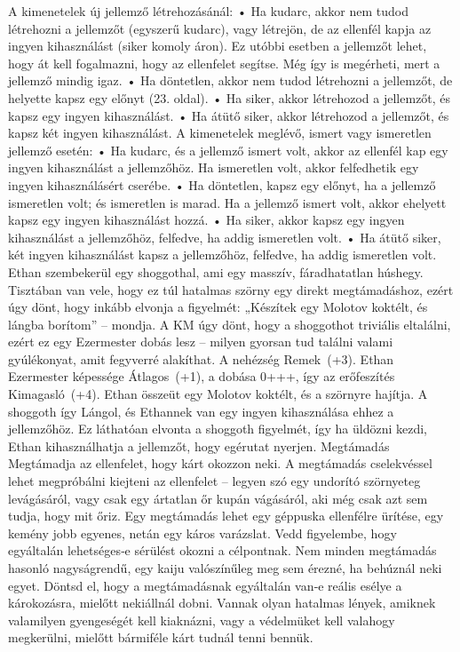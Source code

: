 \documentclass[oneside]{book}
\begin{document}
A kimenetelek új jellemző létrehozásánál:
    • Ha kudarc, akkor nem tudod létrehozni a jellemzőt (egyszerű kudarc), vagy létrejön, de az ellenfél kapja az ingyen kihasználást (siker komoly áron). Ez utóbbi esetben a jellemzőt lehet, hogy át kell fogalmazni, hogy az ellenfelet segítse. Még így is megérheti, mert a jellemző mindig igaz.
    • Ha döntetlen, akkor nem tudod létrehozni a jellemzőt, de helyette kapsz egy előnyt (23. oldal).
    • Ha siker, akkor létrehozod a jellemzőt, és kapsz egy ingyen kihasználást.
    • Ha átütő siker, akkor létrehozod a jellemzőt, és kapsz két ingyen kihasználást.
A kimenetelek meglévő, ismert vagy ismeretlen jellemző esetén:
    • Ha kudarc, és a jellemző ismert volt, akkor az ellenfél kap egy ingyen kihasználást a jellemzőhöz. Ha ismeretlen volt, akkor felfedhetik egy ingyen kihasználásért cserébe.
    • Ha döntetlen, kapsz egy előnyt, ha a jellemző ismeretlen volt; és ismeretlen is marad. Ha a jellemző ismert volt, akkor ehelyett kapsz egy ingyen kihasználást hozzá.
    • Ha siker, akkor kapsz egy ingyen kihasználást a jellemzőhöz, felfedve, ha addig ismeretlen volt.
    • Ha átütő siker, két ingyen kihasználást kapsz a jellemzőhöz, felfedve, ha addig ismeretlen volt.
Ethan szembekerül egy shoggothal, ami egy masszív, fáradhatatlan húshegy. Tisztában van vele, hogy ez túl hatalmas szörny egy direkt megtámadáshoz, ezért úgy dönt, hogy inkább elvonja a figyelmét: „Készítek egy Molotov koktélt, és lángba borítom” – mondja.
A KM úgy dönt, hogy a shoggothot triviális eltalálni, ezért ez egy Ezermester dobás lesz – milyen gyorsan tud találni valami gyúlékonyat, amit fegyverré alakíthat. A nehézség Remek~(+3). Ethan Ezermester képessége Átlagos~(+1), a dobása 0+++, így az erőfeszítés Kimagasló~(+4).
Ethan összeüt egy Molotov koktélt, és a szörnyre hajítja. A shoggoth így Lángol, és Ethannek van egy ingyen kihasználása ehhez a jellemzőhöz. Ez láthatóan elvonta a shoggoth figyelmét, így ha üldözni kezdi, Ethan kihasználhatja a jellemzőt, hogy egérutat nyerjen.
Megtámadás
Megtámadja az ellenfelet, hogy kárt okozzon neki.
A megtámadás cselekvéssel lehet megpróbálni kiejteni az ellenfelet – legyen szó egy undorító szörnyeteg levágásáról, vagy csak egy ártatlan őr kupán vágásáról, aki még csak azt sem tudja, hogy mit őriz. Egy megtámadás lehet egy géppuska ellenfélre ürítése, egy kemény jobb egyenes, netán egy káros varázslat.
Vedd figyelembe, hogy egyáltalán lehetséges‑e sérülést okozni a célpontnak. Nem minden megtámadás hasonló nagyságrendű, egy kaiju valószínűleg meg sem érezné, ha behúznál neki egyet. Döntsd el, hogy a megtámadásnak egyáltalán van‑e reális esélye a károkozásra, mielőtt nekiállnál dobni. Vannak olyan hatalmas lények, amiknek valamilyen gyengeségét kell kiaknázni, vagy a védelmüket kell valahogy megkerülni, mielőtt bármiféle kárt tudnál tenni bennük.
\end{document}
